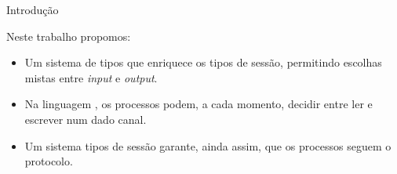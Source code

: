 \begin{frame}[fragile]{Introdução}

Neste trabalho propomos:
\begin{itemize}
\item Um sistema de tipos que enriquece os tipos de sessão, permitindo escolhas mistas entre \textit{input} e \textit{output}.
\vspace*{2mm}
\item Na linguagem \mixedchoice, os processos podem, a cada momento, decidir entre ler e escrever num dado canal.
\vspace*{2mm}
\item Um sistema tipos de sessão garante, ainda assim, que os processos seguem o protocolo.
\end{itemize}

\end{frame}


